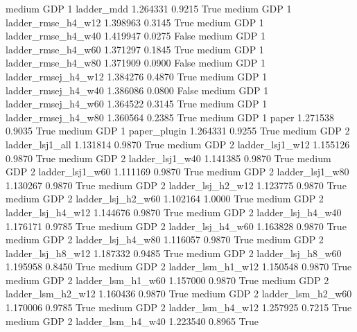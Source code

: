     medium      GDP                 1          ladder_mdd   1.264331      0.9215    True
    medium      GDP                 1  ladder_rmse_h4_w12   1.398963      0.3145    True
    medium      GDP                 1  ladder_rmse_h4_w40   1.419947      0.0275   False
    medium      GDP                 1  ladder_rmse_h4_w60   1.371297      0.1845    True
    medium      GDP                 1  ladder_rmse_h4_w80   1.371909      0.0900   False
    medium      GDP                 1 ladder_rmsej_h4_w12   1.384276      0.4870    True
    medium      GDP                 1 ladder_rmsej_h4_w40   1.386086      0.0800   False
    medium      GDP                 1 ladder_rmsej_h4_w60   1.364522      0.3145    True
    medium      GDP                 1 ladder_rmsej_h4_w80   1.360564      0.2385    True
    medium      GDP                 1               paper   1.271538      0.9035    True
    medium      GDP                 1        paper_plugin   1.264331      0.9255    True
    medium      GDP                 2     ladder_lsj1_all   1.131814      0.9870    True
    medium      GDP                 2     ladder_lsj1_w12   1.155126      0.9870    True
    medium      GDP                 2     ladder_lsj1_w40   1.141385      0.9870    True
    medium      GDP                 2     ladder_lsj1_w60   1.111169      0.9870    True
    medium      GDP                 2     ladder_lsj1_w80   1.130267      0.9870    True
    medium      GDP                 2   ladder_lsj_h2_w12   1.123775      0.9870    True
    medium      GDP                 2   ladder_lsj_h2_w60   1.102164      1.0000    True
    medium      GDP                 2   ladder_lsj_h4_w12   1.144676      0.9870    True
    medium      GDP                 2   ladder_lsj_h4_w40   1.176171      0.9785    True
    medium      GDP                 2   ladder_lsj_h4_w60   1.163828      0.9870    True
    medium      GDP                 2   ladder_lsj_h4_w80   1.116057      0.9870    True
    medium      GDP                 2   ladder_lsj_h8_w12   1.187332      0.9485    True
    medium      GDP                 2   ladder_lsj_h8_w60   1.195958      0.8450    True
    medium      GDP                 2   ladder_lsm_h1_w12   1.150548      0.9870    True
    medium      GDP                 2   ladder_lsm_h1_w60   1.157000      0.9870    True
    medium      GDP                 2   ladder_lsm_h2_w12   1.160436      0.9870    True
    medium      GDP                 2   ladder_lsm_h2_w60   1.170006      0.9785    True
    medium      GDP                 2   ladder_lsm_h4_w12   1.257925      0.7215    True
    medium      GDP                 2   ladder_lsm_h4_w40   1.223540      0.8965    True
